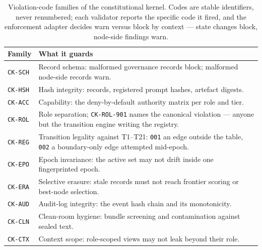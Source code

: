\begin{table}[t]
  \centering
  \small
  \begin{tabularx}{\columnwidth}{@{}lX@{}}
    \toprule
    \textbf{Family} & \textbf{What it guards} \\
    \midrule
    \texttt{CK-SCH} & Record schema: malformed governance records
      block; malformed node-side records warn. \\
    \texttt{CK-HSH} & Hash integrity: records, registered prompt
      hashes, artefact digests. \\
    \texttt{CK-ACC} & Capability: the deny-by-default authority
      matrix per role and tier. \\
    \texttt{CK-ROL} & Role separation; \texttt{CK-ROL-901} names the
      canonical violation --- anyone but the transition engine
      writing the registry. \\
    \texttt{CK-REG} & Transition legality against T1--T21:
      \texttt{001} an edge outside the table, \texttt{002} a
      boundary-only edge attempted mid-epoch. \\
    \texttt{CK-EPO} & Epoch invariance: the active set may not drift
      inside one fingerprinted epoch. \\
    \texttt{CK-ERA} & Selective erasure: stale records must not
      reach frontier scoring or best-node selection. \\
    \texttt{CK-AUD} & Audit-log integrity: the event hash chain and
      its monotonicity. \\
    \texttt{CK-CLN} & Clean-room hygiene: bundle screening and
      contamination against sealed text. \\
    \texttt{CK-CTX} & Context scope: role-scoped views may not leak
      beyond their role. \\
    \bottomrule
  \end{tabularx}
  \caption{Violation-code families of the constitutional kernel.
    Codes are stable identifiers, never renumbered; each validator
    reports the specific code it fired, and the enforcement adapter
    decides warn versus block by context --- state changes block,
    node-side findings warn.}
  \label{tab:ck-codes}
\end{table}

